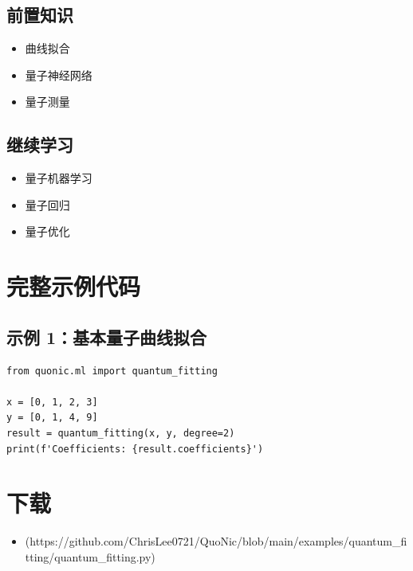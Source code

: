 \documentclass[12pt,a4paper]{article}
\begin{document}
\subsection{前置知识}
\begin{itemize}
  \item 曲线拟合
  \item 量子神经网络
  \item 量子测量
\end{itemize}

\subsection{继续学习}
\begin{itemize}
  \item 量子机器学习
  \item 量子回归
  \item 量子优化
\end{itemize}

\section{完整示例代码}

\subsection{示例 1：基本量子曲线拟合}

\begin{verbatim}
from quonic.ml import quantum_fitting

x = [0, 1, 2, 3]
y = [0, 1, 4, 9]
result = quantum_fitting(x, y, degree=2)
print(f'Coefficients: {result.coefficients}')
\end{verbatim}

\section{下载}

\begin{itemize}
  \item [quantum\_fitting.py](https://github.com/ChrisLee0721/QuoNic/blob/main/examples/quantum_fitting/quantum_fitting.py)
\end{itemize}
\end{document}
